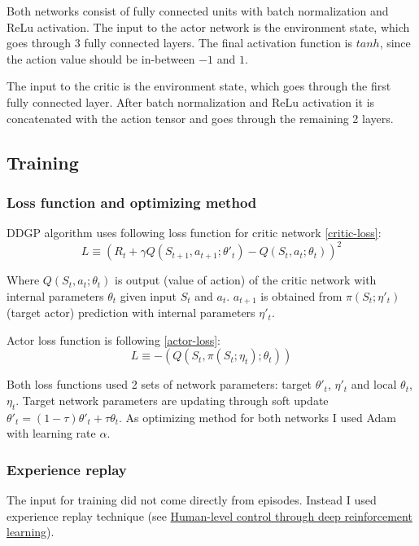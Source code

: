 \documentclass{report}
\begin{document}
Both networks consist of fully connected units with batch normalization and ReLu activation. The input to the actor network is the environment state, which goes through 3 fully connected layers. The final activation function is \(tanh\), since the action value should be in-between \(-1\) and \(1\).

The input to the critic is the environment state, which goes through the first fully connected layer. After batch normalization and ReLu activation it is concatenated with the action tensor and goes through the remaining 2 layers.

\subsection*{Training}
\subsubsection*{Loss function and optimizing method}

DDGP algorithm uses following loss function for critic network \ref{critic-loss}:
\begin{equation} \label{critic-loss}
L \equiv (R_t + \gamma Q(S_{t+1}, a_{t+1}; \theta'_t) - Q(S_t, a_t; \theta_t))^{2}
\end{equation}

Where \(Q(S_t, a_t; \theta_t)\) is output (value of action) of the critic network with internal parameters \(\theta_t\) given input \(S_t\) and \(a_t\). \(a_{t+1}\) is obtained from \(\pi(S_t; \eta'_t)\) (target actor) prediction with internal parameters \(\eta'_t\).

Actor loss function is following \ref{actor-loss}:
\begin{equation} \label{actor-loss}
L \equiv -(Q(S_t, \pi(S_t; \eta_t); \theta_t))
\end{equation}

Both loss functions used 2 sets of network parameters: target \(\theta'_t\), \(\eta'_t\) and local \(\theta_t\), \(\eta_t\). Target network parameters are updating through soft update \(\theta'_t = (1 - \tau) \theta'_t + \tau \theta_t\).
As optimizing method for both networks I used Adam with learning rate \(\alpha\).

\subsubsection*{Experience replay}
The input for training did not come directly from episodes. Instead I used experience replay technique (see \href{https://storage.googleapis.com/deepmind-media/dqn/DQNNaturePaper.pdf}{Human-level control through deep reinforcement learning}).
\end{document}
